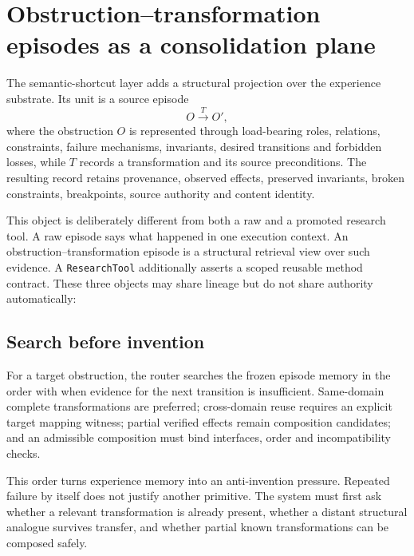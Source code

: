 \section{Obstruction--transformation episodes as a consolidation plane}
\label{sec:ot-memory}

The semantic-shortcut layer adds a structural projection over the experience substrate. Its unit is a source episode
\[
O\xrightarrow{T}O',
\]
where the obstruction $O$ is represented through load-bearing roles, relations, constraints, failure mechanisms, invariants, desired transitions and forbidden losses, while $T$ records a transformation and its source preconditions. The resulting record retains provenance, observed effects, preserved invariants, broken constraints, breakpoints, source authority and content identity.

This object is deliberately different from both a raw \TaskEpisode{} and a promoted research tool. A raw episode says what happened in one execution context. An obstruction--transformation episode is a structural retrieval view over such evidence. A \texttt{ResearchTool} additionally asserts a scoped reusable method contract. These three objects may share lineage but do not share authority automatically:

\subsection{Search before invention}

For a target obstruction, the router searches the frozen episode memory in the order
with \CANNOTCHECK{} when evidence for the next transition is insufficient. Same-domain complete transformations are preferred; cross-domain reuse requires an explicit target mapping witness; partial verified effects remain composition candidates; and an admissible composition must bind interfaces, order and incompatibility checks.

This order turns experience memory into an anti-invention pressure. Repeated failure by itself does not justify another primitive. The system must first ask whether a relevant transformation is already present, whether a distant structural analogue survives transfer, and whether partial known transformations can be composed safely.

